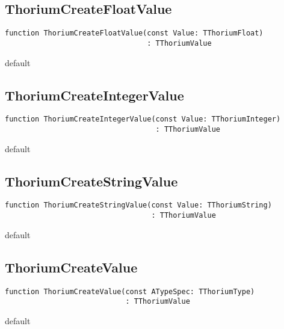 \subsection{ThoriumCreateFloatValue}
\label{thoriumcore:thorium:thoriumcreatefloatvalue}
\begin{FPCList}
\Synopsis
\Declaration 

\begin{verbatim}
function ThoriumCreateFloatValue(const Value: TThoriumFloat)
                                 : TThoriumValue
\end{verbatim}
\Visibility
default
\Description
\Errors
\end{FPCList}
\subsection{ThoriumCreateIntegerValue}
\label{thoriumcore:thorium:thoriumcreateintegervalue}
\begin{FPCList}
\Synopsis
\Declaration 

\begin{verbatim}
function ThoriumCreateIntegerValue(const Value: TThoriumInteger)
                                   : TThoriumValue
\end{verbatim}
\Visibility
default
\Description
\Errors
\end{FPCList}
\subsection{ThoriumCreateStringValue}
\label{thoriumcore:thorium:thoriumcreatestringvalue}
\begin{FPCList}
\Synopsis
\Declaration 

\begin{verbatim}
function ThoriumCreateStringValue(const Value: TThoriumString)
                                  : TThoriumValue
\end{verbatim}
\Visibility
default
\Description
\Errors
\end{FPCList}
\subsection{ThoriumCreateValue}
\label{thoriumcore:thorium:thoriumcreatevalue}
\begin{FPCList}
\Synopsis
\Declaration 

\begin{verbatim}
function ThoriumCreateValue(const ATypeSpec: TThoriumType)
                            : TThoriumValue
\end{verbatim}
\Visibility
default
\Description
\Errors
\end{FPCList}
